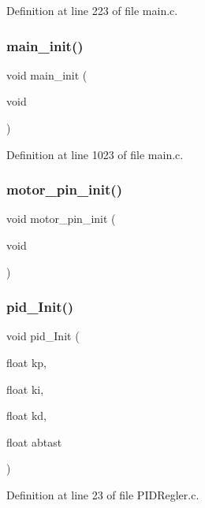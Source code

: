 Definition at line 223 of file main.\+c.

\mbox{\label{main_8c_a3719465edd56d2b587a6b340f29e4f90}} 
\subsubsection{main\+\_\+init()}
{\footnotesize\ttfamily void main\+\_\+init (\begin{DoxyParamCaption}\item[{void}]{ }\end{DoxyParamCaption})}



Definition at line 1023 of file main.\+c.

\mbox{\label{main_8c_a2a00fa9585fe5ae6ac014698aa65cc57}} 
\subsubsection{motor\+\_\+pin\+\_\+init()}
{\footnotesize\ttfamily void motor\+\_\+pin\+\_\+init (\begin{DoxyParamCaption}\item[{void}]{ }\end{DoxyParamCaption})}

\mbox{\label{main_8c_a6eb065a52b581d2104b4c7cefb169469}} 
\subsubsection{pid\+\_\+\+Init()}
{\footnotesize\ttfamily void pid\+\_\+\+Init (\begin{DoxyParamCaption}\item[{float}]{kp,  }\item[{float}]{ki,  }\item[{float}]{kd,  }\item[{float}]{abtast }\end{DoxyParamCaption})}



Definition at line 23 of file P\+I\+D\+Regler.\+c.

\mbox{\label{main_8c_a4f2540c2811f6e4c4c136f964b5b8545}} 
